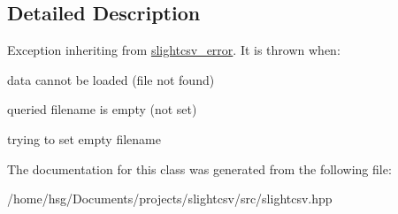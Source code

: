 \subsection{Detailed Description}
Exception inheriting from \hyperlink{classutils_1_1slightcsv__error}{slightcsv\+\_\+error}. It is thrown when\+:
\begin{DoxyItemize}
\item data cannot be loaded (file not found)
\item queried filename is empty (not set)
\item trying to set empty filename 
\end{DoxyItemize}

The documentation for this class was generated from the following file\+:\begin{DoxyCompactItemize}
\item 
/home/hsg/\+Documents/projects/slightcsv/src/slightcsv.\+hpp\end{DoxyCompactItemize}
